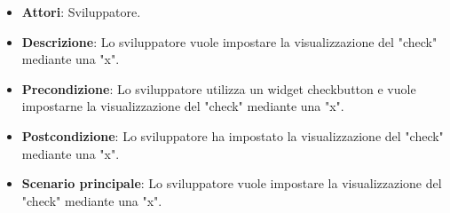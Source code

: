
\FloatBarrier
\begin{itemize}
\item\textbf{Attori}: Sviluppatore.
\item\textbf{Descrizione}: Lo sviluppatore vuole impostare la visualizzazione del "check" mediante una "x".
\item\textbf{Precondizione}: Lo sviluppatore utilizza un widget checkbutton e vuole impostarne la visualizzazione del "check" mediante una "x".
\item\textbf{Postcondizione}: Lo sviluppatore ha impostato la visualizzazione del "check" mediante una "x".
\item\textbf{Scenario principale}: Lo sviluppatore vuole impostare la visualizzazione del "check" mediante una "x".
\end{itemize}
